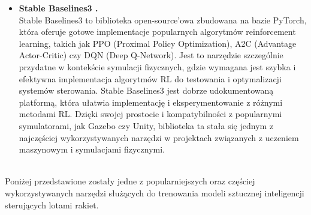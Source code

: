 \begin{itemize}
    \item \textbf{Stable Baselines3 \cite{stable-baselines3}.} \\
    Stable Baselines3 to biblioteka open-source'owa zbudowana na bazie PyTorch, która oferuje gotowe implementacje popularnych algorytmów reinforcement learning, takich jak PPO (Proximal Policy Optimization), A2C (Advantage Actor-Critic) czy DQN (Deep Q-Network). Jest to narzędzie szczególnie przydatne w kontekście symulacji fizycznych, gdzie wymagana jest szybka i efektywna implementacja algorytmów RL do testowania i optymalizacji systemów sterowania. Stable Baselines3 jest dobrze udokumentowaną platformą, która ułatwia implementację i eksperymentowanie z różnymi metodami RL. Dzięki swojej prostocie i kompatybilności z popularnymi symulatorami, jak Gazebo czy Unity, biblioteka ta stała się jednym z najczęściej wykorzystywanych narzędzi w projektach związanych z uczeniem maszynowym i symulacjami fizycznymi.
\end{itemize}

\\
Poniżej przedstawione zostały jedne
z popularniejszych oraz częściej wykorzystywanych narzędzi służących do
trenowania modeli sztucznej inteligencji sterujących lotami rakiet.\\

